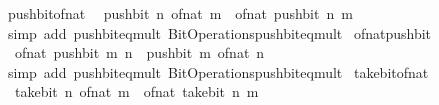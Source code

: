 \begin{isabellebody}
\ push{\isacharunderscore}{\kern0pt}bit{\isacharunderscore}{\kern0pt}of{\isacharunderscore}{\kern0pt}nat{\isacharcolon}{\kern0pt}\isanewline
\ \ {\isacartoucheopen}push{\isacharunderscore}{\kern0pt}bit\ n\ {\isacharparenleft}{\kern0pt}of{\isacharunderscore}{\kern0pt}nat\ m{\isacharparenright}{\kern0pt}\ {\isacharequal}{\kern0pt}\ of{\isacharunderscore}{\kern0pt}nat\ {\isacharparenleft}{\kern0pt}push{\isacharunderscore}{\kern0pt}bit\ n\ m{\isacharparenright}{\kern0pt}{\isacartoucheclose}\isanewline
%
\isadelimproof
\ \ %
\endisadelimproof
%
\isatagproof
{}\isamarkupfalse%
\ {\isacharparenleft}{\kern0pt}simp\ add{\isacharcolon}{\kern0pt}\ push{\isacharunderscore}{\kern0pt}bit{\isacharunderscore}{\kern0pt}eq{\isacharunderscore}{\kern0pt}mult\ Bit{\isacharunderscore}{\kern0pt}Operations{\isachardot}{\kern0pt}push{\isacharunderscore}{\kern0pt}bit{\isacharunderscore}{\kern0pt}eq{\isacharunderscore}{\kern0pt}mult{\isacharparenright}{\kern0pt}%
\endisatagproof
{\isafoldproof}%
%
\isadelimproof
\isanewline
%
\endisadelimproof
\isanewline
{}\isamarkupfalse%
\ of{\isacharunderscore}{\kern0pt}nat{\isacharunderscore}{\kern0pt}push{\isacharunderscore}{\kern0pt}bit{\isacharcolon}{\kern0pt}\isanewline
\ \ {\isacartoucheopen}of{\isacharunderscore}{\kern0pt}nat\ {\isacharparenleft}{\kern0pt}push{\isacharunderscore}{\kern0pt}bit\ m\ n{\isacharparenright}{\kern0pt}\ {\isacharequal}{\kern0pt}\ push{\isacharunderscore}{\kern0pt}bit\ m\ {\isacharparenleft}{\kern0pt}of{\isacharunderscore}{\kern0pt}nat\ n{\isacharparenright}{\kern0pt}{\isacartoucheclose}\isanewline
%
\isadelimproof
\ \ %
\endisadelimproof
%
\isatagproof
{}\isamarkupfalse%
\ {\isacharparenleft}{\kern0pt}simp\ add{\isacharcolon}{\kern0pt}\ push{\isacharunderscore}{\kern0pt}bit{\isacharunderscore}{\kern0pt}eq{\isacharunderscore}{\kern0pt}mult\ Bit{\isacharunderscore}{\kern0pt}Operations{\isachardot}{\kern0pt}push{\isacharunderscore}{\kern0pt}bit{\isacharunderscore}{\kern0pt}eq{\isacharunderscore}{\kern0pt}mult{\isacharparenright}{\kern0pt}%
\endisatagproof
{\isafoldproof}%
%
\isadelimproof
\isanewline
%
\endisadelimproof
\isanewline
{}\isamarkupfalse%
\ take{\isacharunderscore}{\kern0pt}bit{\isacharunderscore}{\kern0pt}of{\isacharunderscore}{\kern0pt}nat{\isacharcolon}{\kern0pt}\isanewline
\ \ {\isacartoucheopen}take{\isacharunderscore}{\kern0pt}bit\ n\ {\isacharparenleft}{\kern0pt}of{\isacharunderscore}{\kern0pt}nat\ m{\isacharparenright}{\kern0pt}\ {\isacharequal}{\kern0pt}\ of{\isacharunderscore}{\kern0pt}nat\ {\isacharparenleft}{\kern0pt}take{\isacharunderscore}{\kern0pt}bit\ n\ m{\isacharparenright}{\kern0pt}{\isacartoucheclose}\isanewline

\end{isabellebody}
